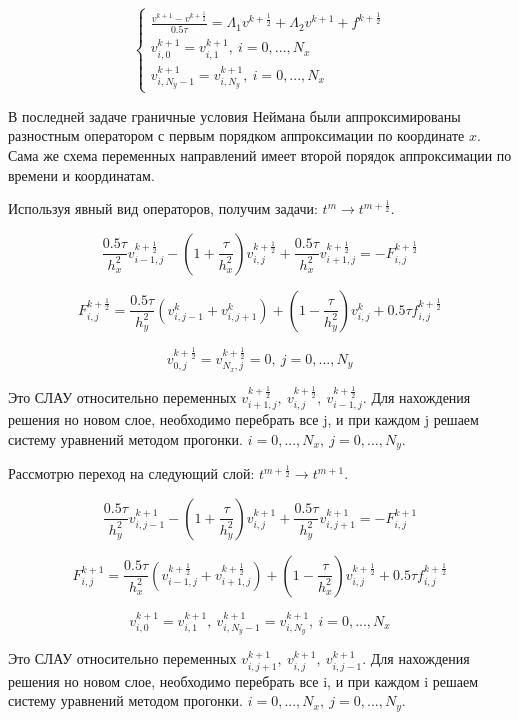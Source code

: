 \documentclass[a4paper,14pt]{article}
\begin{document}
\begin{equation*}
\begin{cases}
   \frac{v^{k+1}-v^{k+\frac{1}{2}}}{0.5\tau} = \Lambda_1 v^{k+\frac{1}{2}} + \Lambda_2 v^{k+1} + f^{k+\frac{1}{2}} \\
   v^{k+1}_{i, 0} = v^{k+1}_{i,1}, \ i=0,...,N_x \\
   v^{k+1}_{i,N_y-1} = v^{k+1}_{i,N_y}, \ i=0,...,N_x
 \end{cases}
\end{equation*}

В последней задаче граничные условия Неймана были аппроксимированы разностным оператором с первым порядком аппроксимации по координате $x$. Сама же схема переменных направлений имеет второй порядок аппроксимации по времени и координатам.

\noindent Используя явный вид операторов, получим задачи: $t^{m} \rightarrow t^{m+ \frac{1}{2}}$.

$$\frac{0.5 \tau}{h_x^2} v_{i-1,j}^{k+\frac{1}{2}} - (1+\frac{\tau}{h_x^2})v_{i,j}^{k+\frac{1}{2}} + \frac{0.5 \tau}{h_x^2} v_{i+1,j}^{k+\frac{1}{2}} = -F_{i,j}^{k+\frac{1}{2}}$$

$$F_{i,j}^{k+\frac{1}{2}} = \frac{0.5 \tau}{h_y^2} (v_{i,j-1}^{k}+v_{i,j+1}^{k})+(1-\frac{\tau}{h_y^2})v_{i,j}^{k} + 0.5 \tau f^{k+\frac{1}{2}}_{i,j}$$

$$v^{k+\frac{1}{2}}_{0, j} = v^{k+\frac{1}{2}}_{N_x,j}=0, \ j=0,...,N_y$$


Это СЛАУ относительно переменных $v_{i+1,j}^{k+\frac{1}{2}}, \ v_{i,j}^{k+\frac{1}{2}}, \ v_{i-1,j}^{k+\frac{1}{2}}$. Для нахождения решения но новом слое, необходимо перебрать все j, и при каждом j решаем систему уравнений методом прогонки. $i = 0,...,N_x, \ j=0,...,N_y$.

Рассмотрю переход на следующий слой: $t^{m+ \frac{1}{2}} \rightarrow t^{m+1}$.

$$\frac{0.5 \tau}{h_y^2} v_{i,j-1}^{k+1} - (1+\frac{\tau}{h_y^2})v_{i,j}^{k+1} + \frac{0.5 \tau}{h_y^2} v_{i,j+1}^{k+1} = -F_{i,j}^{k+1}$$

$$F_{i,j}^{k+1} = \frac{0.5 \tau}{h_x^2} (v_{i-1,j}^{k+\frac{1}{2}}+v_{i+1,j}^{k+\frac{1}{2}})+(1-\frac{\tau}{h_x^2})v_{i,j}^{k+\frac{1}{2}} + 0.5 \tau f^{k+\frac{1}{2}}_{i,j}$$

$$ v^{k+1}_{i, 0} = v^{k+1}_{i,1}, \ v^{k+1}_{i,N_y-1} = v^{k+1}_{i,N_y}, \ i=0,...,N_x$$

Это СЛАУ относительно переменных $v_{i,j+1}^{k+1}, \ v_{i,j}^{k+1}, \ v_{i,j-1}^{k+1}$. Для нахождения решения но новом слое, необходимо перебрать все i, и при каждом i решаем систему уравнений методом прогонки. $i = 0,...,N_x, \ j=0,...,N_y$.
\end{document}
